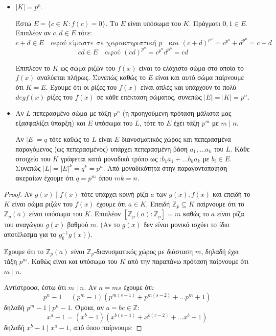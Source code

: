 \documentclass[oneside,a4paper]{article}
\newcommand{\Z}{\mathbb{Z}}
\begin{document}
\begin{enumerate}
\begin{itemize}
				\item $ |K| = p^n$.
					$ $\newline

					Έστω $Ε= \{ c \in K: f(c) = 0 \}$. Το $E$ είναι υπόσωμα του $K$. Πράγματι $0,1 \in E$. Επιπλέον αν $c,d \in E$ τότε:
					$$c+d \in E \quad\text{αφού είμαστε σε χαρακτηριστική } p \quad\text{και } (c+d)^{p^n} = c^{p^n} + d^{p^n} = c + d$$
					$$cd \in E \quad\text{αφού } (cd)^{p^n} = c^{p^n} d^{p^n} = cd$$

					Επιπλέον το $K$ ως σώμα ριζών του $f(x)$ είναι το ελάχιστο σώμα στο οποίο το $f(x)$ αναλύεται πλήρως. Συνεπώς καθώς το $E$ είναι και αυτό σώμα παίρνουμε ότι $K=E$.
					Έχουμε ότι οι ρίζες του $f(x)$ είναι απλές και υπάρχουν το πολύ $degf(x)$ ρίζες του $f(x)$ σε κάθε επέκταση σώματος, συνεπώς $|E|= |K| = p^n$.
					$ $\newline

				\item Αν $L$ πεπερασμένο σώμα με τάξη $p^n$ (η προηγούμενη πρόταση μάλιστα μας εξασφαλίζει ύπαρξη) και $E$ υπόσωμα του $L$, τότε το $E$ έχει τάξη $p^m$ με $m \mid n$.
					$ $\newline

					Αν $|E| = q$ τότε καθώς το $L$ είναι $E$-διανυσματικός χώρος και πεπερασμένα παραγόμενος (ως πεπερασμένος) υπάρχει πεπερασμένη βάση ${a_1,\ldots a_k}$ του $L$.
					Κάθε στοιχείο του $K$ γράφεται κατά μοναδικό τρόπο ως :$ b_1 a_1 + \ldots b_k a_k $ με $b_i \in E$. Συνεπώς $ |L|=|E|^k = q^k = p^n$. Από μοναδικότητα στην παραγοντοποίηση ακεραίων έχουμε ότι $q = p^m$ όπου $ mk = n$.
			\end{itemize}

			\begin{proof}
				Αν $g(x) \mid f(x)$ τότε υπάρχει κοινή ρίζα $a$ των $g(x),f(x)$ και επειδή το $K$ είναι σώμα ριζών του $f(x)$ έχουμε ότι $a \in K$. Επειδή $\Z_p \subseteq K$ παίρνουμε ότι το $\Z_p (a)$ είναι υπόσωμα του $K$. Επιπλέον $[\Z_p (a) : \Z_p] = m$ καθώς το $a$ είναι ρίζα του αναγώγου $g(x)$ βαθμού $m$. (Αν το $g(x)$ δεν είναι μονικό ισχύει το ίδιο αποτέλεσμα για το $g_0^{-1} g(x)$).

				Έχουμε ότι το $\Z_p (a)$ είναι $\Z_p$-διανυσματικός χώρος με διάσταση $m$, δηλαδή έχει τάξη $p^m$. Καθώς είναι και υπόσωμα του $K$ από την παραπάνω πρόταση παίρνουμε ότι $m \mid n$.

				Αντίστροφα, έστω ότι $m \mid n$. Αν $n=ms$ έχουμε ότι:
				$$p^n-1 = (p^m - 1)(p^{m(s-1)} + p^{m(s-2)} + \ldots p^m + 1 )$$
				δηλαδή $p^m -1 \mid p^n - 1$. Όμοια, αν $a=bc \in \Z$:
				$$x^a - 1 = (x^b-1) (x^{b(c-1)} + x^{b(c-2)} + \ldots x^b + 1)$$
				δηλαδή $x^b - 1 \mid x^a -1$, από όπου παίρνουμε:
			

\end{proof}
\end{enumerate}
\end{document}
